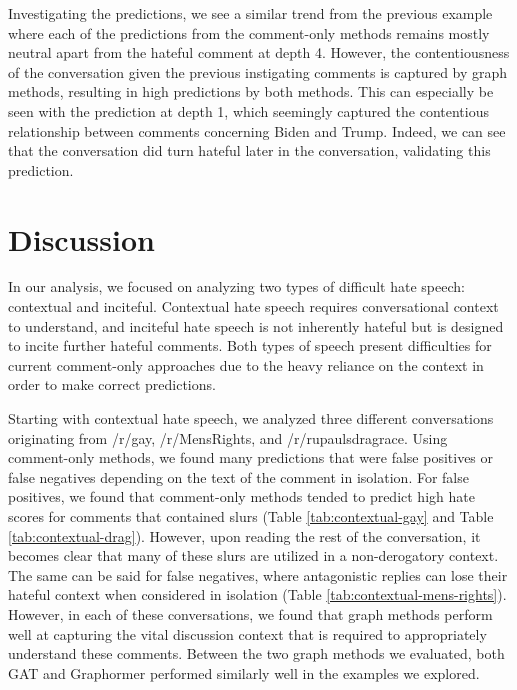 \documentclass[letterpaper]{article} %
\begin{document}
Investigating the predictions, we see a similar trend from the previous example where each of the predictions from the comment-only methods remains mostly neutral apart from the hateful comment at depth 4. However, the contentiousness of the conversation given the previous instigating comments is captured by graph methods, resulting in high predictions by both methods. This can especially be seen with the prediction at depth 1, which seemingly captured the contentious relationship between comments concerning Biden and Trump. Indeed, we can see that the conversation did turn hateful later in the conversation, validating this prediction.

\section{Discussion}
In our analysis, we focused on analyzing two types of difficult hate speech: contextual and inciteful. Contextual hate speech requires conversational context to understand, and inciteful hate speech is not inherently hateful but is designed to incite further hateful comments. Both types of speech present difficulties for current comment-only approaches due to the heavy reliance on the context in order to make correct predictions.

Starting with contextual hate speech, we analyzed three different conversations originating from /r/gay, /r/MensRights, and /r/rupaulsdragrace. Using comment-only methods, we found many predictions that were false positives or false negatives depending on the text of the comment in isolation. For false positives, we found that comment-only methods tended to predict high hate scores for comments that contained slurs (Table \ref{tab:contextual-gay} and Table \ref{tab:contextual-drag}). However, upon reading the rest of the conversation, it becomes clear that many of these slurs are utilized in a non-derogatory context. The same can be said for false negatives, where antagonistic replies can lose their hateful context when considered in isolation (Table \ref{tab:contextual-mens-rights}). However, in each of these conversations, we found that graph methods perform well at capturing the vital discussion context that is required to appropriately understand these comments. Between the two graph methods we evaluated, both GAT and Graphormer performed similarly well in the examples we explored.
\end{document}
